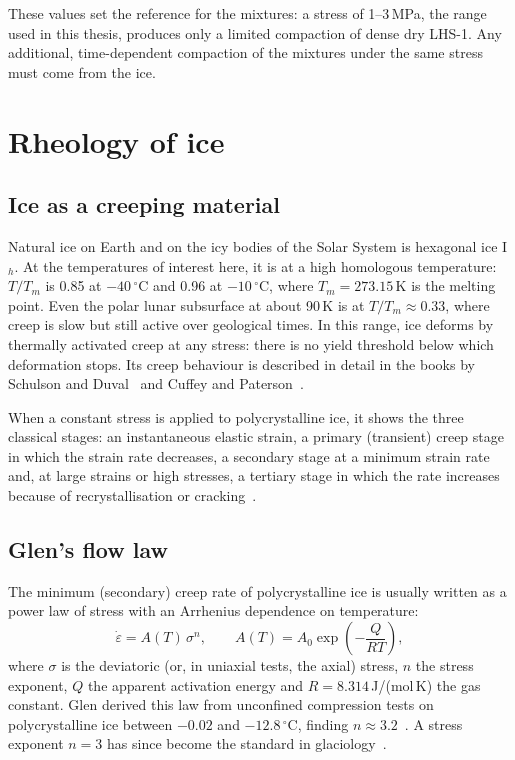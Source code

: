 These values set the reference for the mixtures: a stress of 1--3\,MPa, the range used in this thesis, produces only a limited compaction of dense dry LHS-1. Any additional, time-dependent compaction of the mixtures under the same stress must come from the ice.

\section{Rheology of ice}
\label{sec:ice_rheology}

\subsection{Ice as a creeping material}

Natural ice on Earth and on the icy bodies of the Solar System is hexagonal ice I$_h$. At the temperatures of interest here, it is at a high homologous temperature: $T/T_m$ is 0.85 at $-40\,^\circ$C and 0.96 at $-10\,^\circ$C, where $T_m = 273.15$\,K is the melting point. Even the polar lunar subsurface at about 90\,K is at $T/T_m\approx0.33$, where creep is slow but still active over geological times. In this range, ice deforms by thermally activated creep at any stress: there is no yield threshold below which deformation stops. Its creep behaviour is described in detail in the books by Schulson and Duval~\cite{schulson2009} and Cuffey and Paterson~\cite{cuffey2010}.

When a constant stress is applied to polycrystalline ice, it shows the three classical stages: an instantaneous elastic strain, a primary (transient) creep stage in which the strain rate decreases, a secondary stage at a minimum strain rate and, at large strains or high stresses, a tertiary stage in which the rate increases because of recrystallisation or cracking~\cite{schulson2009}.

\subsection{Glen's flow law}

The minimum (secondary) creep rate of polycrystalline ice is usually written as a power law of stress with an Arrhenius dependence on temperature:
\begin{equation}
    \dot\varepsilon = A(T)\,\sigma^n, \qquad A(T) = A_0 \exp\left(-\frac{Q}{RT}\right),
    \label{eq:glen}
\end{equation}
where $\sigma$ is the deviatoric (or, in uniaxial tests, the axial) stress, $n$ the stress exponent, $Q$ the apparent activation energy and $R = 8.314$\,J/(mol\,K) the gas constant. Glen derived this law from unconfined compression tests on polycrystalline ice between $-0.02$ and $-12.8\,^\circ$C, finding $n\approx3.2$~\cite{glen1955}. A stress exponent $n = 3$ has since become the standard in glaciology~\cite{cuffey2010}.

